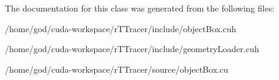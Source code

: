 The documentation for this class was generated from the following files\+:\begin{DoxyCompactItemize}
\item 
/home/god/cuda-\/workspace/r\+T\+Tracer/include/object\+Box.\+cuh\item 
/home/god/cuda-\/workspace/r\+T\+Tracer/include/geometry\+Loader.\+cuh\item 
/home/god/cuda-\/workspace/r\+T\+Tracer/source/object\+Box.\+cu\end{DoxyCompactItemize}
